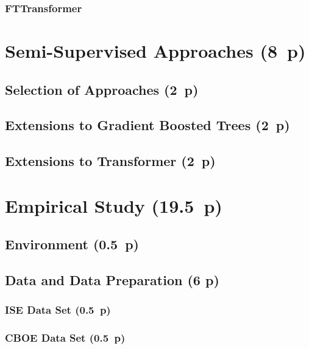 \subsubsection{FTTransformer}\label{sec:fttransformer}


\newpage
\section{Semi-Supervised Approaches (8~p)}\label{sec:semi-supervised-approaches}

\subsection{Selection of Approaches (2~p)}\label{sec:selection-of-approaches-1}

\subsection{Extensions to Gradient Boosted
  Trees (2~p)}\label{sec:extensions-to-gradient-boosted-trees}

\subsection{Extensions to Transformer (2~p)}\label{sec:extensions-to-transformer}


\newpage
\section{Empirical Study (19.5~p)}\label{sec:empirical-study}

\subsection{Environment (0.5~p)}\label{sec:environment}

\subsection{Data and Data Preparation (6 p)}\label{sec:data-and-data-preparation}

\subsubsection{ISE Data Set (0.5~p)}\label{sec:ise-data-set}

\subsubsection{CBOE Data Set (0.5~p)}\label{sec:cboe-data-set}

